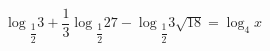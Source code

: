 \begin{ex}[type=equation]
	\begin{condition}
		 $\log$\tiny$_{\dfrac{1}{2}}$\normalsize$ 3  + \dfrac{1}{3}\log$\tiny$_{\dfrac{1}{2}}$\normalsize$27 - \log$\tiny$_{\dfrac{1}{2}}$\normalsize$ 3\sqrt{18}= \log_4 x$
	\end{condition}
\end{ex}